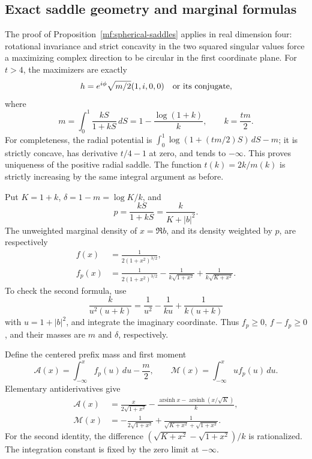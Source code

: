 \subsection{Exact saddle geometry and marginal formulas}

The proof of Proposition~\ref{mf:spherical-saddles} applies in real
dimension four: rotational invariance and strict concavity in the two
squared singular values force a maximizing complex direction to be
circular in the first coordinate plane.
For \(t>4\), the maximizers are exactly
\[
 h=e^{i\phi}\sqrt{m/2}(1,i,0,0)
 \quad\hbox{or its conjugate},
\]
where
\begin{equation}\label{mf:four-saddle}
 m=\int_0^1\frac{kS}{1+kS}\,dS
   =1-\frac{\log(1+k)}k,\qquad k=\frac{tm}{2}.
\end{equation}
For completeness, the radial potential is
\(\int_0^1\log(1+(tm/2)S)\,dS-m\); it is strictly concave, has
derivative \(t/4-1\) at zero, and tends to \(-\infty\).
This proves uniqueness of the positive radial saddle.
The function \(t(k)=2k/m(k)\) is strictly increasing by the same
integral argument as before.

Put \(K=1+k\), \(\delta=1-m=\log K/k\), and
\[
 p=\frac{kS}{1+kS}=\frac{k}{K+|b|^2}.
\]
The unweighted marginal density of \(x=\Re b\), and its density
weighted by \(p\), are respectively
\begin{align}
 f(x)&=\frac1{2(1+x^2)^{3/2}},\label{mf:four-f}\\
 f_p(x)&=
 \frac1{2(1+x^2)^{3/2}}
 -\frac1{k\sqrt{1+x^2}}
 +\frac1{k\sqrt{K+x^2}}.\label{mf:four-fp}
\end{align}
To check the second formula, use
\[
 \frac{k}{u^2(u+k)}=\frac1{u^2}-\frac1{ku}
                         +\frac1{k(u+k)}
\]
with \(u=1+|b|^2\), and integrate the imaginary coordinate.
Thus \(f_p\ge0\), \(f-f_p\ge0\), and their masses are \(m\) and
\(\delta\), respectively.

Define the centered prefix mass and first moment
\[
 \mathcal A(x)=\int_{-\infty}^x f_p(u)\,du-\frac m2,\qquad
 \mathcal M(x)=\int_{-\infty}^x u f_p(u)\,du.
\]
Elementary antiderivatives give
\begin{align}
 \mathcal A(x)
 &=\frac{x}{2\sqrt{1+x^2}}
   -\frac{\operatorname{arsinh}x-
          \operatorname{arsinh}(x/\sqrt K)}k,\label{mf:four-prefix}\\
 \mathcal M(x)
 &=-\frac1{2\sqrt{1+x^2}}
   +\frac1{\sqrt{K+x^2}+\sqrt{1+x^2}}.\label{mf:four-moment}
\end{align}
For the second identity, the difference
\((\sqrt{K+x^2}-\sqrt{1+x^2})/k\) is rationalized.
The integration constant is fixed by the zero limit at \(-\infty\).

